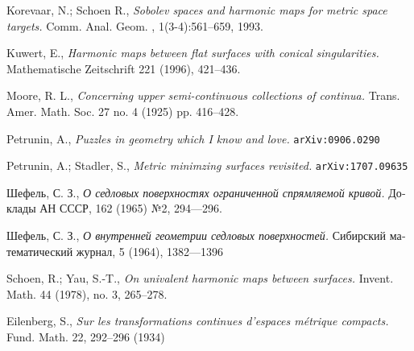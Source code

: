 \documentclass{article}
\begin{document}
\begin{thebibliography}{52}
 Korevaar, N.; Schoen R., 
\textit{Sobolev spaces and harmonic maps for metric space targets.}
Comm. Anal. Geom. , 1(3-4):561–659, 1993.

 Kuwert, E.,
\textit{Harmonic maps between flat surfaces with conical singularities.}
Mathematische Zeitschrift 221 (1996), 421--436.

Moore, R. L.,
\textit{Concerning upper semi-continuous collections of continua.}
Trans. Amer. Math. Soc. 27 no. 4 (1925) pp. 416--428.

 Petrunin, A., 
\textit{Puzzles in geometry which I know and love.}
\texttt{arXiv:0906.0290}

 Petrunin, A.; Stadler, S., 
\textit{Metric minimzing surfaces revisited.} \texttt{arXiv:1707.09635}

\begin{otherlanguage}{russian}
Шефель, С. З.,
\textit{О седловых поверхностях ограниченной спрямляемой кривой.}
Доклады АН СССР, 162 (1965) №2, 
294---296.
\end{otherlanguage}

\begin{otherlanguage}{russian}
Шефель, С. З., 
\textit{О внутренней геометрии седловых поверхностей.}
Сибирский математический журнал, 5 (1964), 1382---1396
\end{otherlanguage}

 Schoen, R.; Yau, S.-T.,
\textit{On univalent harmonic maps between surfaces.}
Invent. Math. 44 (1978), no. 3, 265--278. 

 Eilenberg, S.,
\textit{Sur les transformations continues d’espaces m\'{e}trique compacts.}
Fund. Math. 22, 292--296 (1934)

\end{thebibliography}

\Addresses
\end{document}
